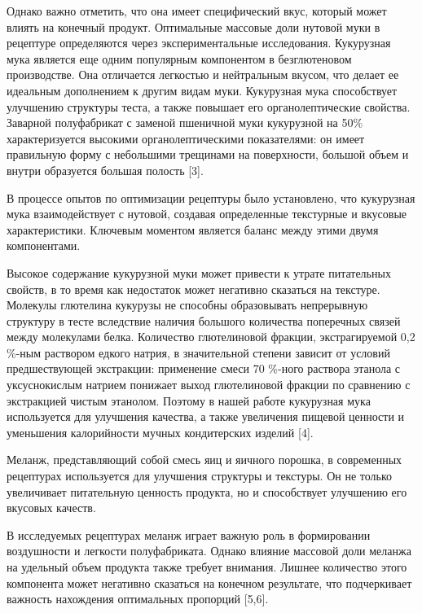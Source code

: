 \begin{multicols}{2}
Однако важно отметить, что она имеет специфический вкус, который может
влиять на конечный продукт. Оптимальные массовые доли нутовой муки в
рецептуре определяются через экспериментальные исследования. Кукурузная
мука является еще одним популярным компонентом в безглютеновом
производстве. Она отличается легкостью и нейтральным вкусом, что делает
ее идеальным дополнением к другим видам муки. Кукурузная мука
способствует улучшению структуры теста, а также повышает его
органолептические свойства. Заварной полуфабрикат с заменой пшеничной
муки кукурузной на 50\% характеризуется высокими органолептическими
показателями: он имеет правильную форму с небольшими трещинами на
поверхности, большой объем и внутри образуется большая полость {[}3{]}.

В процессе опытов по оптимизации рецептуры было установлено, что
кукурузная мука взаимодействует с нутовой, создавая определенные
текстурные и вкусовые характеристики. Ключевым моментом является баланс
между этими двумя компонентами.

Высокое содержание кукурузной муки может привести к утрате питательных
свойств, в то время как недостаток может негативно сказаться на
текстуре. Молекулы глютелина кукурузы не способны образовывать
непрерывную структуру в тесте вследствие наличия большого количества
поперечных связей между молекулами белка. Количество глютелиновой
фракции, экстрагируемой 0,2 \%-ным раствором едкого натрия, в
значительной степени зависит от условий предшествующей экстракции:
применение смеси 70 \%-ного раствора этанола с уксуснокислым натрием
понижает выход глютелиновой фракции по сравнению с экстракцией чистым
этанолом. Поэтому в нашей работе кукурузная мука используется для
улучшения качества, а также увеличения пищевой ценности и уменьшения
калорийности мучных кондитерских изделий {[}4{]}.

Меланж, представляющий собой смесь яиц и яичного порошка, в современных
рецептурах используется для улучшения структуры и текстуры. Он не только
увеличивает питательную ценность продукта, но и способствует улучшению
его вкусовых качеств.

В исследуемых рецептурах меланж играет важную роль в формировании
воздушности и легкости полуфабриката. Однако влияние массовой доли
меланжа на удельный объем продукта также требует внимания. Лишнее
количество этого компонента может негативно сказаться на конечном
результате, что подчеркивает важность нахождения оптимальных пропорций
{[}5,6{]}.


\end{multicols}
